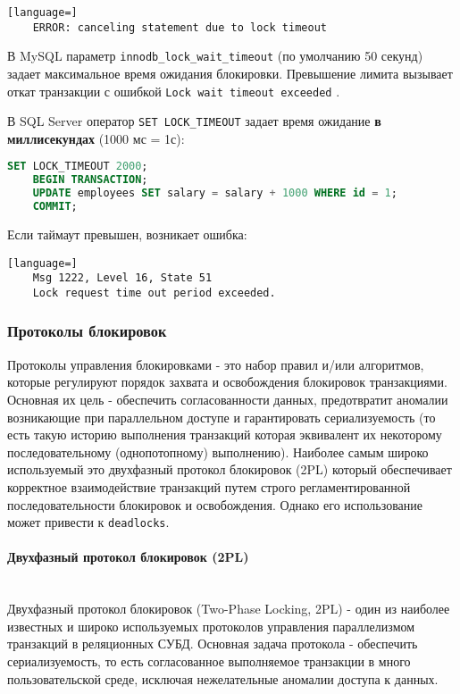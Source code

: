\begin{lstlisting}[language=]
    ERROR: canceling statement due to lock timeout
\end{lstlisting}

В MySQL параметр \texttt{innodb\_lock\_wait\_timeout} (по умолчанию 50 секунд) задает максимальное время ожидания блокировки. Превышение лимита вызывает откат транзакции с ошибкой \texttt{Lock wait timeout exceeded} \autocite[§17.14]{Mysqldoc4}.

В SQL Server оператор \texttt{SET LOCK\_TIMEOUT} \autocite{MicrosoftLearnSQLserverSetLockTout} задает время ожидание \textbf{в миллисекундах} (1000 мс = 1с):
\begin{lstlisting}[language=SQL]
    SET LOCK_TIMEOUT 2000;
    BEGIN TRANSACTION;
    UPDATE employees SET salary = salary + 1000 WHERE id = 1;
    COMMIT;
\end{lstlisting}

Если таймаут превышен, возникает ошибка:
\begin{lstlisting}[language=]
    Msg 1222, Level 16, State 51
    Lock request time out period exceeded.    
\end{lstlisting}


\subsubsection{Протоколы блокировок}

Протоколы управления блокировками - это набор правил и/или алгоритмов, которые регулируют порядок захвата и освобождения блокировок транзакциями. Основная их цель - обеспечить согласованности данных, предотвратит аномалии возникающие при параллельном доступе и гарантировать сериализуемость (то есть такую историю выполнения транзакций которая эквивалент их некоторому последовательному (однопотопному) выполнению).
Наиболее самым широко используемый это двухфазный протокол блокировок (2PL) который обеспечивает корректное взаимодействие транзакций путем строго регламентированной последовательности блокировок и освобождения. Однако его использование может привести к \texttt{deadlocks}.


\paragraph{Двухфазный протокол блокировок (2PL)} ~\\

Двухфазный протокол блокировок (Two-Phase Locking, 2PL) - один из наиболее известных и широко используемых протоколов управления параллелизмом транзакций в реляционных СУБД. Основная задача протокола - обеспечить сериализуемость, то есть согласованное выполняемое транзакции в много пользовательской среде, исключая нежелательные аномалии доступа к данных.

